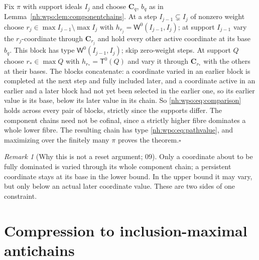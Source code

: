 \documentclass[11pt,a4paper]{article}
\theoremstyle{definition}
\theoremstyle{remark}
\newtheorem{remark}[theorem]{Remark}
\newcommand{\Wz}{\mathsf W^{0}}
\newcommand{\Tz}{\mathsf T^{0}}
\begin{document}
Fix $\pi$ with support ideals $I_j$ and choose $\mathbf C_q$, $b_q$ as in
Lemma~\ref{nh:wpo:lem:componentchains}. At a step $I_{j-1}\subsetneq I_j$ of
nonzero weight choose $r_j\in\max I_{j-1}\setminus\max I_j$ with
$h_{r_j}=\Wz(I_{j-1},I_j)$; at support $I_{j-1}$ vary the $r_j$-coordinate through
$\mathbf C_{r_j}$ and hold every other active coordinate at its base $b_q$. This
block has type $\Wz(I_{j-1},I_j)$; skip zero-weight steps. At support $Q$ choose
$r_*\in\max Q$ with $h_{r_*}=\Tz(Q)$ and vary it through $\mathbf C_{r_*}$ with
the others at their bases. The blocks concatenate: a coordinate varied in an
earlier block is completed at the next step and fully included later, and a
coordinate active in an earlier and a later block had not yet been selected in
the earlier one, so its earlier value is its base, below its later value in its
chain. So \eqref{nh:wpo:eq:comparison} holds across every pair of blocks, strictly
since the supports differ. The component chains need not be cofinal, since a
strictly higher fibre dominates a whole lower fibre. The resulting chain has type
\eqref{nh:wpo:eq:pathvalue}, and maximizing over the finitely many $\pi$ proves
the theorem.\hfill$\square$

\begin{remark}[Why this is not a reset argument; 09]
Only a coordinate about to be fully dominated is varied through its whole
component chain; a persistent coordinate stays at its base in the lower bound. In
the upper bound it may vary, but only below an actual later coordinate value.
These are two sides of one constraint.
\end{remark}

\section{Compression to inclusion-maximal antichains}\label{nh:wpo:sec:compression}
\end{document}

